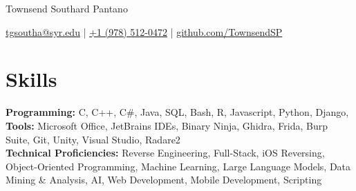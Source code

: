 
\vspace{-70pt}
\centerline{\huge Townsend Southard Pantano}

\vspace{-1pt}

\centerline{\href{mailto:tgsoutha@syr.edu}{tgsoutha@syr.edu} | \href{tel:+19785120472}{+1 (978) 512-0472} | \href{https://github.com/TownsendSP}{github.com/TownsendSP}}
\vspace{-13.5pt}
\section*{Skills}
	\textbf{Programming:} C, C++, C\#, Java, SQL, Bash, R, Javascript, Python, Django, 
\\
\textbf{Tools:} Microsoft Office, JetBrains IDEs, Binary Ninja, Ghidra, Frida, Burp Suite, Git, Unity, Visual Studio, Radare2
\\

\textbf{Technical Proficiencies:} Reverse Engineering, Full-Stack, iOS Reversing, Object-Oriented Programming, Machine Learning, Large Language Models, Data Mining \& Analysis, AI, Web Development, Mobile Development, Scripting
\vspace{-17pt}

